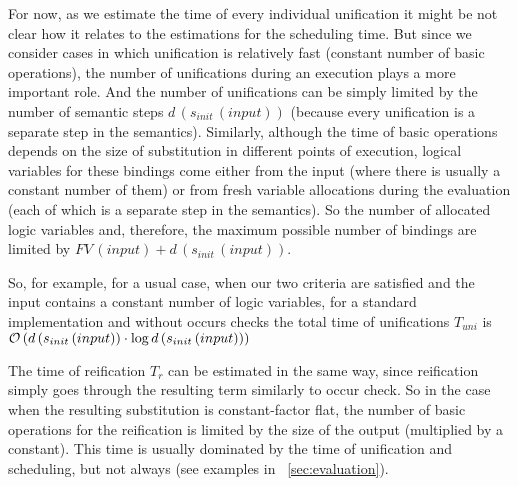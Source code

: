 For now, as we estimate the time of every individual unification it might be not clear how it relates to the estimations for the scheduling time. But since we consider cases in which unification
is relatively fast (constant number of basic operations), the number of unifications during an execution plays a more important role. And the number of unifications can be simply limited by the number of semantic
steps $d\,(s_{init}\,(input))$ (because every unification is a separate step in the semantics). Similarly, although the time of basic operations depends on the size of substitution in different points
of execution, logical variables for these bindings come either from the input (where there is usually a constant number of them) or from fresh variable allocations during the evaluation
(each of which is a separate step in the semantics). So the number of allocated logic variables and, therefore, the maximum possible number of bindings are limited by $FV\,(input) + d\,(s_{init}\,(input))$.

So, for example, for a usual case, when our two criteria are satisfied and the input contains a constant number of logic variables, for a standard implementation and without occurs checks
the total time of unifications $T_{uni}$ is $\mathcal{O}\,(d\,(s_{init}\,(input))\cdot \log d\,(s_{init}\,(input)))$

The time of reification $T_r$ can be estimated in the same way, since reification simply goes through the resulting term similarly to occur check. So in the case when the resulting
substitution is constant-factor flat, the number of basic operations for the reification is limited by the size of the output (multiplied by a constant). This time is usually dominated by the time of unification and scheduling, but not always (see examples in \sectionword~\ref{sec:evaluation}).
